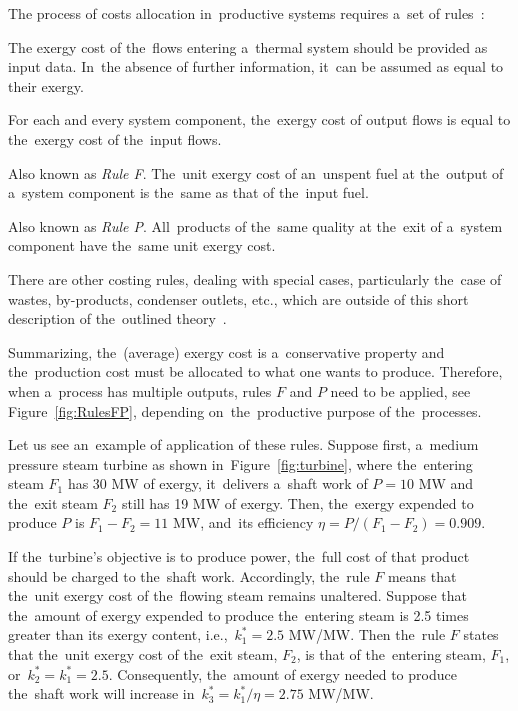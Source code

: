 \documentclass[energies,article,accept,moreauthors,pdftex]{Definitions/mdpi}
\begin{document}
 The process of costs allocation in~productive systems requires a~set of rules~\cite{Lozano1993,Tsatsaronis2007}:
\begin{description}[itemindent=0.2cm,leftmargin=0.7cm,parsep=0.8em,font=\normalfont\itshape]
	\item[Resources Rule:] The exergy cost of the~flows entering a~thermal system should be provided as input data. In~the absence of further information, it~can be assumed as equal to their exergy.
	\item[Cost Conservation Rule:] For each and every system component, the~exergy cost of output flows is equal to the~exergy cost of the~input flows.
	\item[Unspent Fuel Rule:] Also known as \emph{Rule F}. The~unit exergy cost of an~unspent fuel at the~output of a~system component is the~same as that of the~input fuel.
	\item[Co-products Rule:] Also known as \emph{Rule P}. All~products of the~same quality at the~exit of a~system component have the~same unit exergy cost. 
\end{description}

There are other costing rules, dealing with special cases, particularly the~case of wastes, by-products, condenser outlets, etc., which are outside of this short description of the~outlined theory~\cite{Torres2008}.

Summarizing, the~(average) exergy cost is a~conservative property and the~production cost must be allocated to what one wants to produce. Therefore, when a~process has multiple outputs, rules $F$ and $P$ need to be applied, see Figure~\ref{fig:RulesFP}, depending on~the~productive purpose of the~processes. 


Let us see an~example of application of these rules. Suppose first, a~medium pressure steam turbine as shown in~Figure~\ref{fig:turbine}, where the~entering steam $F_1$ has 30 MW of exergy, it~delivers a~shaft work of $P=10$ MW and the~exit steam $F_2$ still has 19 MW of exergy. Then, the~exergy expended to produce $P$ is $F_1-F_2=11$ MW, and~its efficiency $\eta=P/(F_1-F_2)=0.909$.

If the~turbine's objective is to produce power, the~full cost of that product should be charged to the~shaft work. Accordingly, the~rule $F$ means that the~unit exergy cost of the~flowing steam remains unaltered. Suppose that the~amount of exergy expended to produce the~entering steam is 2.5 times greater than its exergy content, i.e.,~$k_1^*=2.5$ MW/MW. Then the~rule $F$ states that the~unit exergy cost of the~exit steam, $F_2$, is that of the~entering steam, $F_1$, or~$k_2^*=k_1^*=2.5$. Consequently, the~amount of exergy needed to produce the~shaft work will increase in~$k_3^*=k_1^*/\eta=2.75$ MW/MW.
\end{document}
